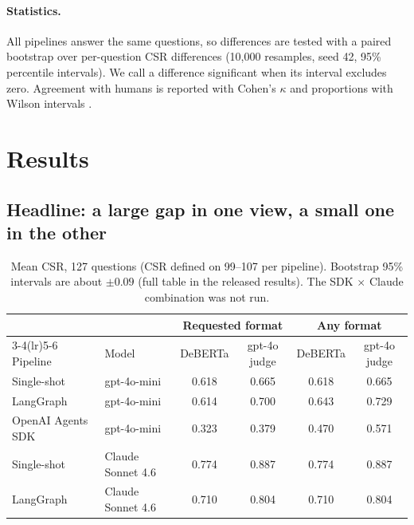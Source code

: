 \documentclass[11pt]{article}
\begin{document}
\paragraph{Statistics.} All pipelines answer the same questions, so differences are tested with a
paired bootstrap over per-question CSR differences \citep{efron1993bootstrap} (10,000 resamples,
seed 42, 95\% percentile intervals). We call a difference significant when its interval excludes
zero. Agreement with humans is reported with Cohen's $\kappa$ \citep{cohen1960kappa} and proportions
with Wilson intervals \citep{wilson1927probable}.

\section{Results}
\label{sec:results}

\subsection{Headline: a large gap in one view, a small one in the other}

\begin{table}[t]
\centering
\small
\begin{tabular}{llcccc}
\toprule
& & \multicolumn{2}{c}{Requested format} & \multicolumn{2}{c}{Any format} \\
\cmidrule(lr){3-4}\cmidrule(lr){5-6}
Pipeline & Model & DeBERTa & gpt-4o judge & DeBERTa & gpt-4o judge \\
\midrule
Single-shot & gpt-4o-mini & 0.618 & 0.665 & 0.618 & 0.665 \\
LangGraph & gpt-4o-mini & 0.614 & 0.700 & 0.643 & 0.729 \\
OpenAI Agents SDK & gpt-4o-mini & 0.323 & 0.379 & 0.470 & 0.571 \\
\midrule
Single-shot & Claude Sonnet 4.6 & 0.774 & 0.887 & 0.774 & 0.887 \\
LangGraph & Claude Sonnet 4.6 & 0.710 & 0.804 & 0.710 & 0.804 \\
\bottomrule
\end{tabular}
\caption{Mean CSR, 127 questions (CSR defined on 99--107 per pipeline). Bootstrap 95\% intervals
are about $\pm0.09$ (full table in the released results). The SDK $\times$ Claude combination was
not run.}
\label{tab:headline}
\end{table}
\end{document}

